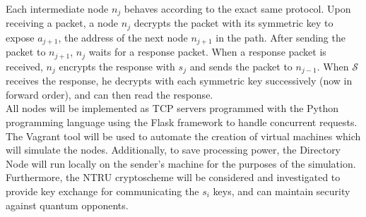 \documentclass[10pt]{article}
\begin{document}
\noindent Each intermediate node $n_j$ behaves according to the exact same protocol. Upon receiving
a packet, a node $n_j$ decrypts the packet with its symmetric key to expose $a_{j+1}$, the
address of the next node $n_{j+1}$ in the path.  After sending the packet to $n_{j+1}$, $n_j$
waits for a response packet.  When a response packet is received, $n_j$ encrypts the response with
$s_j$ and sends the packet to $n_{j-1}$.  When $\mathcal{S}$ receives the response, he decrypts
with each symmetric key successively (now in forward order), and can then read the response.\\

\noindent All nodes will be implemented as TCP servers programmed with the Python programming
language using the Flask framework to handle concurrent requests.  The Vagrant tool will be
used to automate the creation of virtual machines which will simulate the nodes.  Additionally,
to save processing power, the Directory Node will run locally on the sender's machine for the
purposes of the simulation.\\

\noindent Furthermore, the NTRU cryptoscheme will be considered and investigated to
provide key exchange for communicating the $s_i$ keys, and can maintain
security against quantum opponents.
\end{document}
